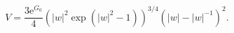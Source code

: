 \begin{equation}\label{SL}
    V = \frac{3 \mathrm{e}^{G_{0}}}{4}(|w|^{2} \exp{(|w|^{2}-1)})^{3/4}(|w| -
    |w|^{-1})^{2}.
\end{equation}

